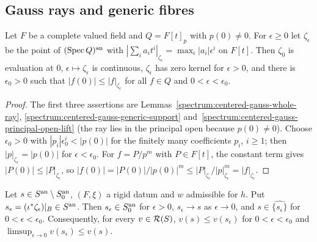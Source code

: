 \subsection{Gauss rays and generic fibres}\label{subsec:nf-gauss}

\begin{lemma}\label{lem:nf-gauss-ray}
\leanok
{}
Let $F$ be a complete valued field and $Q=F[t]_p$ with $p(0)\ne0$. For $\epsilon\ge0$ let $\zeta_\epsilon$ be the point
of $(\operatorname{Spec} Q)^{\mathrm{an}}$ with $|\sum_ia_it^i|_{\zeta_\epsilon}=\max_i|a_i|\epsilon^i$ on $F[t]$. Then $\zeta_0$ is evaluation at
$0$, $\epsilon\mapsto\zeta_\epsilon$ is continuous, $\zeta_\epsilon$ has zero kernel for $\epsilon>0$, and there is
$\epsilon_0>0$ such that $|f(0)|\le|f|_{\zeta_\epsilon}$ for all $f\in Q$ and $0<\epsilon<\epsilon_0$.
\end{lemma}

\begin{proof}
The first three assertions are Lemmas~\ref{spectrum:centered-gauss-whole-ray}, \ref{spectrum:centered-gauss-generic-support}
and~\ref{spectrum:centered-gauss-principal-open-lift} (the ray lies in the principal open because $p(0)\ne0$). Choose
$\epsilon_0>0$ with $|p_i|\epsilon_0^i<|p(0)|$ for the finitely many coefficients $p_i$, $i\ge1$; then
$|p|_{\zeta_\epsilon}=|p(0)|$ for $\epsilon<\epsilon_0$. For $f=P/p^m$ with $P\in F[t]$, the constant term gives
$|P(0)|\le|P|_{\zeta_\epsilon}$, so $|f(0)|=|P(0)|/|p(0)|^m\le|P|_{\zeta_\epsilon}/|p|_{\zeta_\epsilon}^m=|f|_{\zeta_\epsilon}$.
\end{proof}

\begin{lemma}\label{lem:nf-hull-approach}
\leanok
{}
Let $s\in S^{\mathrm{an}}\setminus S_0^{\mathrm{an}}$, $(F,\xi)$ a rigid datum and $w$ admissible for $h$. Put
$s_\epsilon=(\iota^*\zeta_\epsilon)|_B\in S^{\mathrm{an}}$. Then $s_\epsilon\in S_0^{\mathrm{an}}$ for $\epsilon>0$, $s_\epsilon\to s$ as
$\epsilon\to0$, and $s\in\widehat{\{s_\epsilon\}}$ for $0<\epsilon<\epsilon_0$. Consequently, for every $v\in\mathcal{R}(S)$,
$v(s)\le v(s_\epsilon)$ for $0<\epsilon<\epsilon_0$ and $\limsup_{\epsilon\to0}v(s_\epsilon)\le v(s)$.
\end{lemma}

